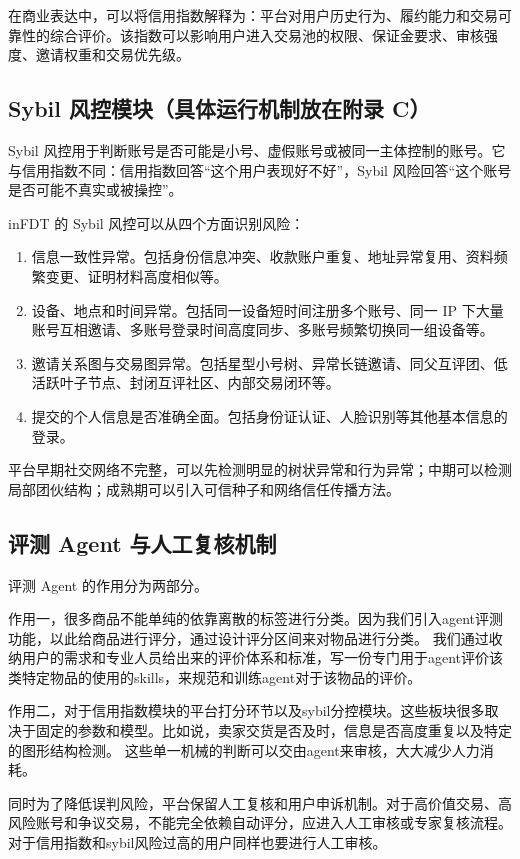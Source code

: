 \documentclass[UTF8,a4paper,12pt]{ctexart}
\begin{document}
在商业表达中，可以将信用指数解释为：平台对用户历史行为、履约能力和交易可靠性的综合评价。该指数可以影响用户进入交易池的权限、保证金要求、审核强度、邀请权重和交易优先级。

\subsection{Sybil 风控模块（具体运行机制放在附录 C）}

Sybil 风控用于判断账号是否可能是小号、虚假账号或被同一主体控制的账号。它与信用指数不同：信用指数回答“这个用户表现好不好”，Sybil 风险回答“这个账号是否可能不真实或被操控”。

inFDT 的 Sybil 风控可以从四个方面识别风险：

\begin{enumerate}
    \item 信息一致性异常。包括身份信息冲突、收款账户重复、地址异常复用、资料频繁变更、证明材料高度相似等。
    \item 设备、地点和时间异常。包括同一设备短时间注册多个账号、同一 IP 下大量账号互相邀请、多账号登录时间高度同步、多账号频繁切换同一组设备等。
    \item 邀请关系图与交易图异常。包括星型小号树、异常长链邀请、同父互评团、低活跃叶子节点、封闭互评社区、内部交易闭环等。
    \item 提交的个人信息是否准确全面。包括身份证认证、人脸识别等其他基本信息的登录。
\end{enumerate}

平台早期社交网络不完整，可以先检测明显的树状异常和行为异常；中期可以检测局部团伙结构；成熟期可以引入可信种子和网络信任传播方法。

\subsection{评测 Agent 与人工复核机制}


评测 Agent 的作用分为两部分。

作用一，很多商品不能单纯的依靠离散的标签进行分类。因为我们引入agent评测功能，以此给商品进行评分，通过设计评分区间来对物品进行分类。
我们通过收纳用户的需求和专业人员给出来的评价体系和标准，写一份专门用于agent评价该类特定物品的使用的skills，来规范和训练agent对于该物品的评价。

作用二，对于信用指数模块的平台打分环节以及sybil分控模块。这些板块很多取决于固定的参数和模型。比如说，卖家交货是否及时，信息是否高度重复以及特定的图形结构检测。
这些单一机械的判断可以交由agent来审核，大大减少人力消耗。


同时为了降低误判风险，平台保留人工复核和用户申诉机制。对于高价值交易、高风险账号和争议交易，不能完全依赖自动评分，应进入人工审核或专家复核流程。
对于信用指数和sybil风险过高的用户同样也要进行人工审核。
\end{document}
